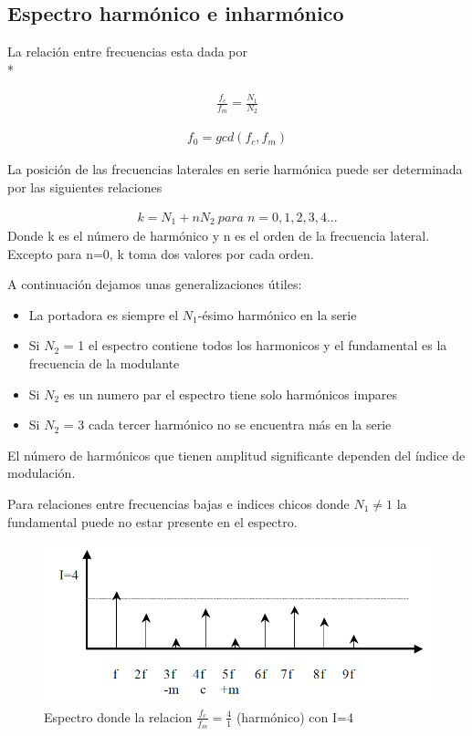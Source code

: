 \documentclass[assd_tp2_main.tex]{subfiles}
\begin{document}
\subsection*{Espectro harmónico e inharmónico}
La relación entre frecuencias esta dada por \\*

\begin{eqnarray*}
\displaystyle \frac{f_c}{f_m}=\frac{N_1}{N_2} 
\end{eqnarray*}
 
\begin{eqnarray*}
\displaystyle f_0=gcd(f_c,f_m)
\end{eqnarray*}
 
La posición de las frecuencias laterales en serie harmónica puede ser determinada por las siguientes relaciones

\begin{eqnarray*}
\displaystyle k = N_1 + nN_2 \: para\; n=0,1,2,3,4...
\end{eqnarray*}
Donde k es el  número de harmónico y n es el orden de la frecuencia lateral.
Excepto para n=0, k toma dos valores por cada orden.

A continuación dejamos unas generalizaciones útiles:
\begin{itemize}
\item La portadora es siempre el $N_1$-ésimo harmónico  en la serie
\item Si $N_2$ = 1 el espectro contiene todos los harmonicos	y el fundamental es la frecuencia de la modulante
\item Si $N_2$ es un numero par el espectro tiene solo harmónicos impares
\item Si $N_2$ = 3 cada tercer harmónico no se encuentra más en la serie
\end{itemize}
 

El número de harmónicos que tienen amplitud significante  dependen del índice de modulación.

Para relaciones entre frecuencias bajas e indices chicos donde $N_1\neq1$ la fundamental puede no estar presente en el espectro.

\begin{figure}[H]
\centering
\includegraphics[width=0.5\linewidth]{graficos/EJ4/espectroharmonico.png}
\caption{Espectro donde la relacion $\displaystyle \frac{f_c}{f_m}=\frac{4}{1}$ (harmónico) con I=4 }
\label{fig:harmonico}
\end{figure}
\end{document}
